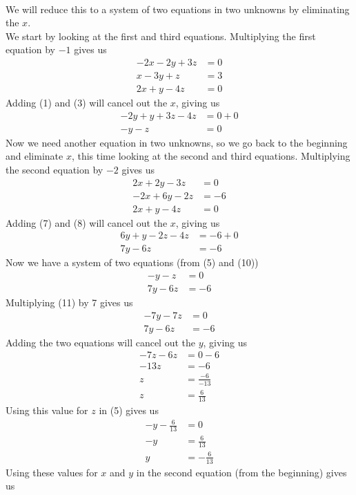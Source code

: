 \documentclass[12pt]{article}
\begin{document}
\\
We will reduce this to a system of two equations in two unknowns by eliminating the $x$. \\
We start by looking at the first and third equations. Multiplying the first equation by $-1$ gives us
\begin{align}
-2x-2y+3z&=0 \\
x-3y+z&=3 \\
2x+y-4z&=0
\end{align}
Adding (1) and (3) will cancel out the $x$, giving us
\begin{align}
-2y+y+3z-4z&=0+0 \\
-y-z&=0
\end{align}
Now we need another equation in two unknowns, so we go back to the beginning and eliminate $x$, this time looking at the second and third equations. Multiplying the second equation by $-2$ gives us
\begin{align}
2x+2y-3z&=0 \\
-2x+6y-2z&=-6 \\
2x+y-4z&=0
\end{align}
Adding (7) and (8) will cancel out the $x$, giving us
\begin{align}
6y+y-2z-4z&=-6+0 \\
7y-6z&=-6
\end{align}
Now we have a system of two equations (from (5) and (10))
\begin{align}
-y-z&=0 \\
7y-6z&=-6
\end{align}
Multiplying (11) by 7 gives us
\begin{align*}
-7y-7z&=0 \\
7y-6z&=-6
\end{align*}
Adding the two equations will cancel out the $y$, giving us
\begin{align*}
-7z-6z&=0-6 \\
-13z&=-6 \\
z&=\displaystyle \frac{-6}{-13} \\
z&=\displaystyle \frac{6}{13}
\end{align*}
Using this value for $z$ in (5) gives us
\begin{align*}
-y-\displaystyle \frac{6}{13}&=0 \\
-y&=\displaystyle \frac{6}{13} \\
y&=-\displaystyle \frac{6}{13}
\end{align*}
Using these values for $x$ and $y$ in the second equation (from the beginning) gives us
\end{document}
